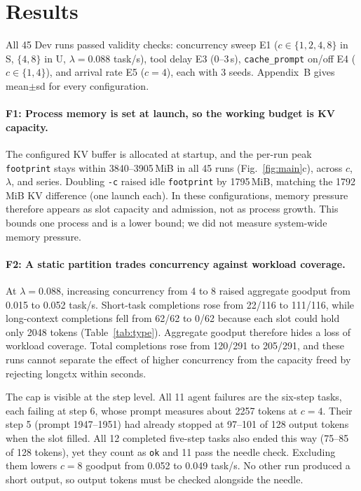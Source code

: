 \documentclass{article}
\begin{document}
\section{Results}
\label{sec:results}
All 45 Dev runs passed validity checks: concurrency sweep E1 ($c\in\{1,2,4,8\}$ in S, $\{4,8\}$ in U, $\lambda{=}0.088$ task/s), tool delay E3 (0--3\,s), \texttt{cache\_prompt} on/off E4 ($c\in\{1,4\}$), and arrival rate E5 ($c{=}4$), each with 3 seeds. Appendix~B gives mean$\pm$sd for every configuration.

\paragraph{F1: Process memory is set at launch, so the working budget is KV capacity.} The configured KV buffer is allocated at startup, and the per-run peak \texttt{footprint} stays within 3840--3905\,MiB in all 45 runs (Fig.~\ref{fig:main}c), across $c$, $\lambda$, and series. Doubling \texttt{-c} raised idle \texttt{footprint} by 1795\,MiB, matching the 1792\,MiB KV difference (one launch each). In these configurations, memory pressure therefore appears as slot capacity and admission, not as process growth. This bounds one process and is a lower bound; we did not measure system-wide memory pressure.

\paragraph{F2: A static partition trades concurrency against workload coverage.} At $\lambda{=}0.088$, increasing concurrency from 4 to 8 raised aggregate goodput from 0.015 to 0.052 task/s. Short-task completions rose from 22/116 to 111/116, while long-context completions fell from 62/62 to 0/62 because each slot could hold only 2048 tokens (Table~\ref{tab:type}). Aggregate goodput therefore hides a loss of workload coverage. Total completions rose from 120/291 to 205/291, and these runs cannot separate the effect of higher concurrency from the capacity freed by rejecting longctx within seconds.

The cap is visible at the step level. All 11 agent failures are the six-step tasks, each failing at step 6, whose prompt measures about 2257 tokens at $c{=}4$. Their step 5 (prompt 1947--1951) had already stopped at 97--101 of 128 output tokens when the slot filled. All 12 completed five-step tasks also ended this way (75--85 of 128 tokens), yet they count as \texttt{ok} and 11 pass the needle check. Excluding them lowers $c{=}8$ goodput from 0.052 to 0.049 task/s. No other run produced a short output, so output tokens must be checked alongside the needle.
\end{document}
